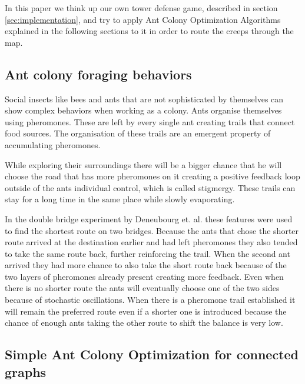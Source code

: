 In this paper we think up our own tower defense game, described in section \ref{sec:implementation}, and try to apply Ant Colony Optimization Algorithms explained in the following sections to it in order to route the creeps through the map.

\subsection{Ant colony foraging behaviors}


Social insects like bees and ants that are not sophisticated by themselves can show complex behaviors when working as a colony. Ants organise themselves using pheromones. These are left by every single ant creating trails that connect food sources. The organisation of these trails are an emergent property of accumulating pheromones\cite{blum2005ant}.

While exploring their surroundings there will be a bigger chance that he will choose the road that has more pheromones on it creating a positive feedback loop outside of the ants individual control, which is called stigmergy. These trails can stay for a long time in the same place while slowly evaporating\cite{cordon2002review}.

In the double bridge experiment by Deneubourg et. al. these features were used to find the shortest route on two bridges. Because the ants that chose the shorter route arrived at the destination earlier and had left pheromones they also tended to take the same route back, further reinforcing the trail. When the second ant arrived they had more chance to also take the short route back because of the two layers of pheromones already present creating more feedback\cite{deneubourg1990self}. Even when there is no shorter route the ants will eventually choose one of the two sides because of stochastic oscillations. When there is a pheromone trail established it will remain the preferred route even if a shorter one is introduced because the chance of enough ants taking the other route to shift the balance is very low\cite{dorigo2006introduction}.

\subsection{Simple Ant Colony Optimization for connected graphs}

